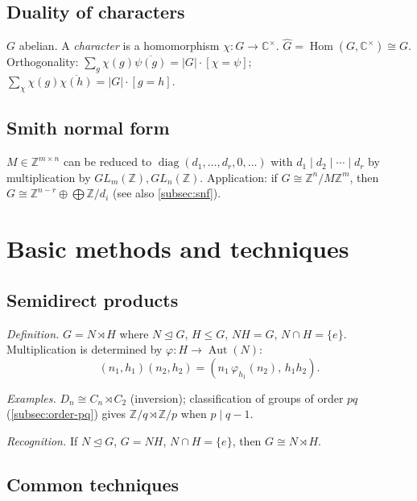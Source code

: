 \subsection{Duality of characters}
\label{subsec:character-duality}

$G$ abelian. A \textit{character} is a homomorphism $\chi:G\to\mathbb{C}^\times$. $\widehat G=\operatorname{Hom}(G,\mathbb{C}^\times)\cong G$.
Orthogonality: $\sum_g\chi(g)\overline{\psi(g)}=|G|\cdot[\chi=\psi]$; $\sum_\chi\chi(g)\overline{\chi(h)}=|G|\cdot[g=h]$.

\subsection{Smith normal form}
\label{subsec:snf-abelian}

$M\in\mathbb{Z}^{m\times n}$ can be reduced to $\operatorname{diag}(d_1,\dots,d_r,0,\dots)$ with $d_1\mid d_2\mid\cdots\mid d_r$ by multiplication by $GL_m(\mathbb{Z}),GL_n(\mathbb{Z})$. Application: if $G\cong\mathbb{Z}^n/M\mathbb{Z}^m$, then $G\cong\mathbb{Z}^{n-r}\oplus\bigoplus\mathbb{Z}/d_i$ (see also \ref{subsec:snf}).

\medskip

\section{Basic methods and techniques}
\label{sec:group-methods}

\subsection{Semidirect products}
\label{subsec:semidirect}

\textit{Definition.} $G=N\rtimes H$ where $N\trianglelefteq G$, $H\le G$, $NH=G$, $N\cap H=\{e\}$. Multiplication is determined by $\varphi:H\to\operatorname{Aut}(N)$:
$$(n_1,h_1)(n_2,h_2)=(n_1\,\varphi_{h_1}(n_2),\,h_1h_2).$$

\textit{Examples.} $D_n\cong C_n\rtimes C_2$ (inversion); classification of groups of order $pq$ (\ref{subsec:order-pq}) gives $\mathbb{Z}/q\rtimes\mathbb{Z}/p$ when $p\mid q-1$.

\textit{Recognition.} If $N\trianglelefteq G$, $G=NH$, $N\cap H=\{e\}$, then $G\cong N\rtimes H$.

\medskip

\subsection{Common techniques}
\label{subsec:group-techniques}

